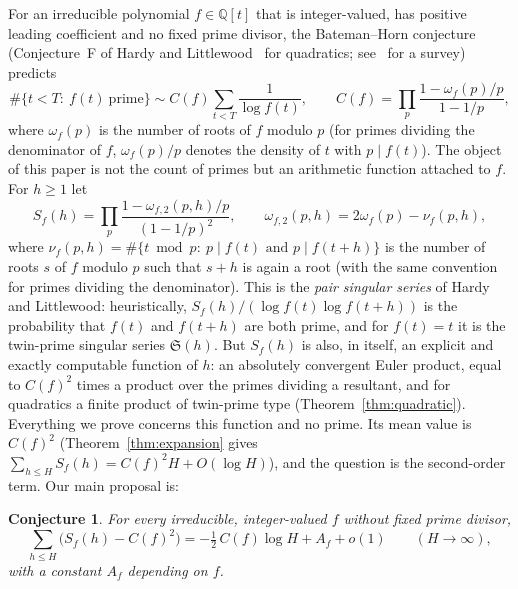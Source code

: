 \documentclass[11pt,a4paper]{article}
\newtheorem{conjecture}[theorem]{Conjecture}
\theoremstyle{remark}\newtheorem{remark}[theorem]{Remark}
\newcommand{\Q}{\mathbb{Q}}
\newcommand{\Sig}{\mathfrak S}
\begin{document}
For an irreducible polynomial $f\in\Q[t]$ that is integer-valued, has positive leading coefficient and
no fixed prime divisor, the Bateman--Horn conjecture~\cite{BatemanHorn1962} (Conjecture~F of Hardy and
Littlewood~\cite{HardyLittlewood1923} for quadratics; see~\cite{Aletheia2020} for a survey) predicts
\begin{equation}\label{eq:BH}
\#\{t<T:\ f(t)\ \text{prime}\}\sim C(f)\sum_{t<T}\frac1{\log f(t)},\qquad
C(f)=\prod_p\frac{1-\omega_f(p)/p}{1-1/p},
\end{equation}
where $\omega_f(p)$ is the number of roots of $f$ modulo $p$ (for primes dividing the denominator of
$f$, $\omega_f(p)/p$ denotes the density of $t$ with $p\mid f(t)$). The object of this paper is not the
count of primes but an arithmetic function attached to $f$. For $h\ge1$ let
\begin{equation}\label{eq:S}
S_f(h)=\prod_p\frac{1-\omega_{f,2}(p,h)/p}{(1-1/p)^2},\qquad
\omega_{f,2}(p,h)=2\omega_f(p)-\nu_f(p,h),
\end{equation}
where $\nu_f(p,h)=\#\{t\bmod p:\ p\mid f(t)\text{ and }p\mid f(t+h)\}$ is the number of roots $s$ of
$f$ modulo $p$ such that $s+h$ is again a root (with the same convention for primes dividing the
denominator). This is the \emph{pair singular series} of Hardy and Littlewood: heuristically,
$S_f(h)/(\log f(t)\log f(t+h))$ is the probability that $f(t)$ and $f(t+h)$ are both prime, and for
$f(t)=t$ it is the twin-prime singular series $\Sig(h)$. But $S_f(h)$ is also, in itself, an explicit
and exactly computable function of $h$: an absolutely convergent Euler product, equal to $C(f)^2$ times
a product over the primes dividing a resultant, and for quadratics a finite product of twin-prime type
(Theorem~\ref{thm:quadratic}). Everything we prove concerns this function and no prime. Its mean value is
$C(f)^2$ (Theorem~\ref{thm:expansion} gives $\sum_{h\le H}S_f(h)=C(f)^2H+O(\log H)$), and the question is
the second-order term. Our main proposal is:

\begin{conjecture}\label{conj}
For every irreducible, integer-valued $f$ without fixed prime divisor,
\begin{equation}\label{eq:conj}
\sum_{h\le H}\bigl(S_f(h)-C(f)^2\bigr)=-\tfrac12\,C(f)\log H+A_f+o(1)\qquad(H\to\infty),
\end{equation}
with a constant $A_f$ depending on $f$.
\end{conjecture}
\end{document}
